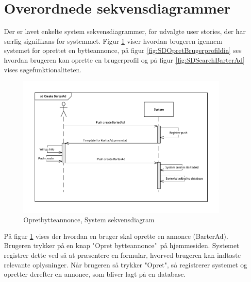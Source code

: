 \section{Overordnede sekvensdiagrammer}
Der er lavet enkelte system sekvensdiagrammer, for udvalgte user stories, der har særlig signifikans for systemmet. Figur \ref{fig:SDOpretBytteannoncedia} viser hvordan brugeren igennem systemet for oprettet en bytteannonce, på figur \ref{fig:SDOpretBrugerprofildia} ses hvordan brugeren kan oprette en brugerprofil og  på figur \ref{fig:SDSearchBarterAd} vises søgefunktionaliteten.

\begin{figure}[H]
	\includegraphics[trim = 6mm 6mm 6mm 6mm, clip, width=0.95\textwidth]{figures/SDOpretBytteAnnonce.PDF}
	\caption{Opretbytteannonce, System sekvensdiagram }
	\label{fig:SDOpretBytteannoncedia}
	\centering
\end{figure}

\noindent På figur \ref{fig:SDOpretBytteannoncedia} vises der hvordan en bruger skal oprette en annonce (BarterAd). Brugeren trykker på en knap "Opret bytteannonce"\ på hjemmesiden. Systemet registrer dette ved så at præsentere en formular, hvorved brugeren kan indtaste relevante oplysninger. Når brugeren så trykker "Opret", så registrerer systemet og opretter derefter en annonce, som bliver lagt på en database.
	
